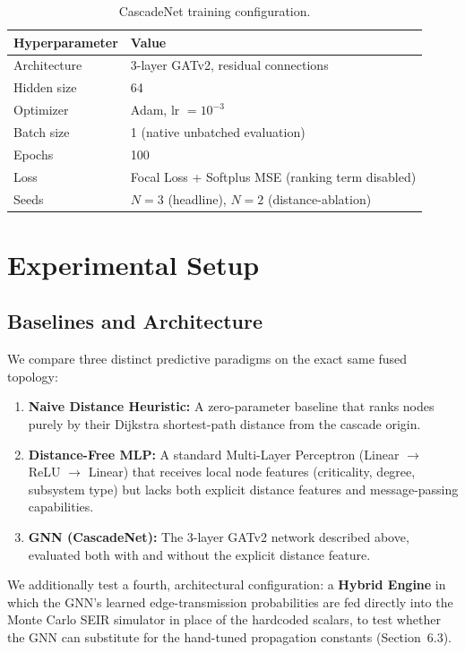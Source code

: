 \documentclass[10pt]{article}
\begin{document}
\begin{table}[ht]
\centering
\small
\caption{CascadeNet training configuration.}
\label{tab:hyperparams}
\begin{tabular}{@{}ll@{}}
\toprule
\textbf{Hyperparameter} & \textbf{Value} \\ \midrule
Architecture & 3-layer GATv2, residual connections \\
Hidden size & 64 \\
Optimizer & Adam, lr $=10^{-3}$ \\
Batch size & 1 (native unbatched evaluation) \\
Epochs & 100 \\
Loss & Focal Loss + Softplus MSE (ranking term disabled) \\
Seeds & $N=3$ (headline), $N=2$ (distance-ablation) \\ \bottomrule
\end{tabular}
\end{table}

\section{Experimental Setup}
\subsection{Baselines and Architecture}
We compare three distinct predictive paradigms on the exact same fused topology:
\begin{enumerate}[noitemsep]
    \item \textbf{Naive Distance Heuristic:} A zero-parameter baseline that ranks nodes purely by their Dijkstra shortest-path distance from the cascade origin.
    \item \textbf{Distance-Free MLP:} A standard Multi-Layer Perceptron (Linear $\to$ ReLU $\to$ Linear) that receives local node features (criticality, degree, subsystem type) but lacks both explicit distance features and message-passing capabilities.
    \item \textbf{GNN (CascadeNet):} The 3-layer GATv2 network described above, evaluated both with and without the explicit distance feature.
\end{enumerate}
We additionally test a fourth, architectural configuration: a \textbf{Hybrid Engine} in which the GNN's learned edge-transmission probabilities are fed directly into the Monte Carlo SEIR simulator in place of the hardcoded scalars, to test whether the GNN can substitute for the hand-tuned propagation constants (Section~6.3).
\end{document}

